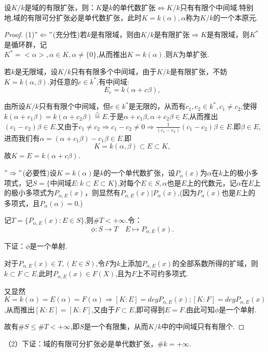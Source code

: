 \documentclass[UTF8]{article}
\begin{document}
设$K/k$是域的有限扩张，则：$K$是$k$的单代数扩张$\Longleftrightarrow K/k$只有有限个中间域.特别地,域的有限可分扩张必是单代数扩张，此时$K=k(\alpha),\alpha$称为$K/k$的一个本原元.
\begin{proof}
(1)$"\Leftarrow"$(充分性)若$k$是有限域，则由$K/k$是有限扩张$\Rightarrow K$是有限域，则$K^*$是循环群，记\\%
$K^*=<\alpha>,\alpha\in K,\alpha\ne\{0\}$,从而推出$K=k(\alpha)$.则$K$为单扩张.

若$k$是无限域，设$K/k$只有有限多个中间域，由于$K/k$是有限扩张，不妨$K=k(\alpha,\beta)$.对任意的$c\in k^*$,有中间域:$$E_c=k(\alpha+c\beta),$$

由所设$K/k$只有有限个中间域，但$c\in k^*$是无限的，从而有$c_1,c_2\in k^*,c_1\ne c_2$,使得$k(\alpha+c_1\beta)=k(\alpha+c_2\beta)\stackrel{\bigtriangleup}{=}E$.于是$\alpha+c_1\beta,\alpha+c_2\beta\in E$,从而推出$(c_1-c_2)\beta\in E$.又由于$c_1\ne c_2\Rightarrow c_1-c_2\ne 0\Rightarrow\frac{1}{(c_1-c_2)}(c_1-c_2)\beta\in E$.即$\beta\in E$,进而我们有$\alpha=(\alpha+c_1\beta)-c_1\beta\in E$.即$$K=k(\alpha,\beta)\subset E\subset K,$$故$K=E=k(\alpha + c\beta)$.

$"\Rightarrow"$(必要性)设$K=k(\alpha)$是$k$的一个单代数扩张，设$P_{\alpha}(x)$为$\alpha$在$k$上的极小多项式，记$S=\{$中间域$E:k\subset E\subset K\}$,对每个$E\in S,\alpha$也是$E$上的代数元，记$\alpha$在$E$上的极小多项式为$P_{\alpha,E}(x)$，则显然有$P_{\alpha,E}(x)|P_{\alpha}(x)$,(因为$P_{\alpha}(x)$也是$E$上的多项式，且$P_{\alpha}(\alpha)=0$.)

记$T=\{P_{\alpha,E}(x):E\in S\}$,则$\# T< +\infty$.令：$$\phi:S\rightarrow  T\quad E\mapsto P_{\alpha,E}(x).$$

下证：$\phi$是一个单射.

对于$P_{\alpha,E}(x)\in T,(E\in S)$,令$F$为$k$上添加$P_{\alpha,E}(x)$的全部系数所得的扩域，则$k\subset  F \subset E$.此时$P_{\alpha,E}(x)\in F(X)$,且为$F$上不可约多项式.

又显然$K=k(\alpha)=E(\alpha)=F(\alpha)\Rightarrow[K:E]=degP_{\alpha,E}(x);[K:F]=degP_{\alpha,E}(x)$,从而推出$[K:E]=[K:F]$,又由于$F\subset E$,即可得到$E=F$.由此可知$\phi$是一个单射.

故有$\#S\le\#T< +\infty$,即$S$是一个有限集，从而$K/k$中的中间域只有有限个.
\end{proof}
（2）下证：域的有限可分扩张必是单代数扩张，$\#k= +\infty.$
\end{document}
